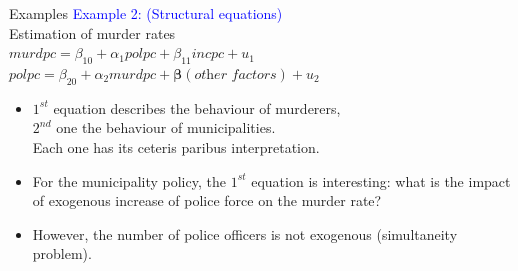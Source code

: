 \documentclass[usenames,dvipsnames]{beamer}
\begin{document}
\begin{frame}{Examples}
\textcolor{Blue}{Example 2: (Structural equations)} \\Estimation of murder rates\\
\medskip
\qquad $\textit{murdpc} = \beta_{10} + \alpha_1 \textit{polpc} +  \beta_{11} \textit{incpc} + u_1$ \\
\qquad \hspace{0.25cm} $\textit{polpc} = \beta_{20} + \alpha_2 \textit{murdpc} + \bm{\beta} (\textit{other factors}) + u_2$ \\
\medskip
\begin{itemize}
\item $1^{st}$ equation describes the behaviour of murderers, \\$2^{nd}$ one the behaviour of municipalities. \\Each one has its ceteris paribus interpretation.\\
\medskip
\item For the municipality policy, the $1^{st}$ equation is interesting: what is the impact of exogenous increase of police force on the murder rate? 
\item However, the number of police officers  is not exogenous (simultaneity problem). 
\end{itemize}
\end{frame}
\end{document}
